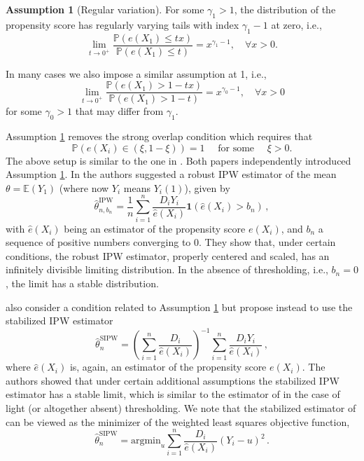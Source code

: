 \documentclass[12pt]{amsart}
\newcommand{\1}{\mathbbm{1}}
\newcommand{\0}{\mathbf{0}}
\newcommand{\one}{\mathbf{1}}
\theoremstyle{plain}
\theoremstyle{definition}
\newtheorem{assumption}[theorem]{Assumption}
\newcommand{\bbP}{\mathbb{P}}
\begin{document}
\begin{assumption}[Regular variation]\label{ass:RV_prop_score}
    For some $\gamma_1>1$, the distribution of the propensity score has regularly varying tails with index $\gamma_1-1$ at zero, i.e.,
    \begin{equation*}
        \lim_{t\to 0^+}\frac{\bbP(e(X_1)\leq t x)}{\bbP(e(X_1)\leq t)}=x^{\gamma_1-1}, \quad \forall x>0.
    \end{equation*}
\end{assumption}
In many cases we also impose a similar assumption at 1, i.e.,
\begin{equation*}
        \lim_{t\to 0^+}\frac{\bbP(e(X_1)> 1-t x)}{\bbP(e(X_1)> 1-t)}=x^{\gamma_0-1}, \quad \forall x>0
    \end{equation*}
for some $\gamma_0>1$  that may differ from $\gamma_1$.

Assumption \ref{ass:RV_prop_score} removes the strong overlap condition which requires that 
%
$$\mathbb{P}(e(X_i)\in (\xi,1-\xi) )=1 \quad \mbox{ for some } \quad \xi>0.$$
%
The above setup is  similar to the one in \cite{ma:wang2020, heiler:kazak2021}. Both papers independently introduced  Assumption \ref{ass:RV_prop_score}. In \cite{ma:wang2020} the authors suggested a robust  IPW estimator of the mean $\theta=\mathbb{E} (Y_1)$  (where now $Y_i$ means  $Y_i(1)$), given by
%
\begin{equation} \label{e:ma.wang}
    \hat\theta_{n,b_n}^{\mathrm{IPW}}= \frac{1}{n}\sum_{i=1}^n \frac{D_iY_i}{\hat e(X_i)}\one (\hat e(X_i)>b_n)\,,
\end{equation}
%
with $\hat e(X_i)$ being an estimator of the propensity score $e(X_i)$, and $b_n$ a sequence of positive numbers converging to 0.  They show that, under certain conditions,  the robust IPW estimator, properly centered and scaled, has an infinitely divisible limiting distribution.  In the absence of thresholding, i.e., $b_n=0$, the limit has a stable distribution.  

\cite{heiler:kazak2021} also consider a condition related to Assumption \ref{ass:RV_prop_score} but propose instead to use the stabilized IPW estimator
%
\begin{equation*}
    \hat\theta_{n}^{\mathrm{SIPW}}= \left(\sum_{i=1}^n \frac{D_i}{\hat e(X_i)}\right)^{-1}\sum_{i=1}^n \frac{D_iY_i}{\hat e(X_i)}\,,
\end{equation*}
where $\hat e(X_i)$ is, again, an estimator of the propensity score $e(X_i)$. The authors showed that under certain additional assumptions   the stabilized IPW estimator has a stable limit, which is similar to the estimator of \cite{ma:wang2020} in the case of light (or altogether absent) thresholding. 
%
We note that the stabilized estimator of \cite{heiler:kazak2021} can be viewed as the minimizer of the weighted least squares objective function,
\begin{equation}
\label{eq:weighted_LS}
    \hat{\theta}^{\mathrm{SIPW}}_{n}= \mbox{argmin}_u \sum_{i=1}^n \frac{D_i}{\hat e(X_i)}(Y_i-u)^2\,.
\end{equation}
\end{document}
